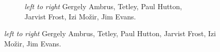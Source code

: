 



\begin{figure}
      \checkoddpage \ifoddpage \forcerectofloat \else \forceversofloat \fi
      \centering
    \begin{subfigure}[t]{\textwidth}
    \centering
        \caption{\textit{left to right} Gergely Ambrus, Tetley, Paul Hutton, Jarvist Frost, Izi Možir, Jim Evans. } \label{bivi jim}
    \end{subfigure}
    
          \vspace{0.3cm}
          

\end{figure}
